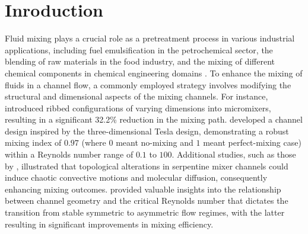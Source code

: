 \documentclass[%
 aip,
 amsmath,amssymb,
 reprint,
]{revtex4-1}
\begin{document}
\maketitle

\section{Inroduction}
\label{sec:headings}
Fluid mixing plays a crucial role as a pretreatment process in various industrial applications, including fuel emulsification in the petrochemical sector, the blending of raw materials in the food industry, and the mixing of different chemical components in chemical engineering domains \citep{Peterwitz2021,Wang2021, Nunez-Flores2020, Yeh2015}. To enhance the mixing of fluids in a channel flow, a commonly employed strategy involves modifying the structural and dimensional aspects of the mixing channels. For instance, \cite{Kim2011} introduced ribbed configurations of varying dimensions into micromixers, resulting in a significant 32.2\% reduction in the mixing path. \cite{Yang2015} developed a channel design inspired by the three-dimensional Tesla design, demonstrating a robust mixing index of $0.97$ (where $0$ meant no-mixing and $1$ meant perfect-mixing case) within a Reynolds number range of $0.1$ to $100$. Additional studies, such as those by \cite{Chen2016}, illustrated that topological alterations in serpentine mixer channels could induce chaotic convective motions and molecular diffusion, consequently enhancing mixing outcomes. \cite{Lobasov2018} provided valuable insights into the relationship between channel geometry and the critical Reynolds number that dictates the transition from stable symmetric to asymmetric flow regimes, with the latter resulting in significant improvements in mixing efficiency.
\end{document}
